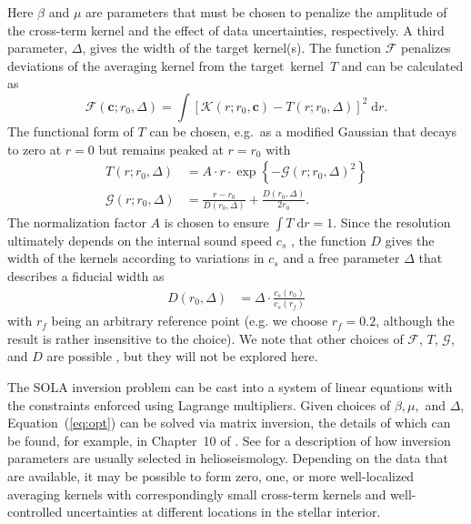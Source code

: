 \fi
Here $\beta$ and $\mu$ are parameters that must be chosen to penalize the amplitude of the cross-term kernel and the effect of data uncertainties, respectively. 
A third parameter, $\Delta$, gives the width of the target kernel(s). 
The function $\mathscr{F}$ penalizes deviations of the averaging kernel from the target~kernel~$T$ and can be calculated as
\begin{equation}
        \mathscr{F}(\mathbf c; r_0, \Delta)
        =  
        \int \left[ \mathscr{K}(r; r_0, \mathbf c) - T(r; r_0, \Delta) \right]^2 \; \text{d}r. 
\end{equation}
The functional form of $T$ can be chosen, e.g.~as a modified Gaussian that decays to zero at ${r=0}$ but remains peaked at ${r=r_0}$ \citep[e.g.][]{1999MNRAS.309...35R} with 
\begin{align}
    T(r; r_0, \Delta) &= A\cdot r\cdot \exp\left\{-\mathcal{G}(r; r_0, \Delta)^2\right\} \\
    \mathcal{G}(r; r_0, \Delta) &= \frac{r-r_0}{D(r_0, \Delta)} + \frac{D(r_0, \Delta)}{2 r_0}.
\end{align}
The normalization factor $A$ is chosen to ensure ${\int T \; \text{d}r = 1}$. 
Since the resolution ultimately depends on the internal sound speed $c_s$ \citep[][]{1993ASPC...42..141T}, the function $D$ gives the width of the kernels according to variations in $c_s$ and a free parameter $\Delta$ that describes a fiducial width as 
\begin{align}
    D(r_0, \Delta) &= \Delta \cdot \frac{c_s(r_0)}{c_s(r_f)} 
\end{align}
with $r_f$ being an arbitrary reference point (e.g. we choose ${r_f=0.2}$, although the result is rather insensitive to the choice). 
We note that other choices of $\mathscr{F}$, $T$, $\mathcal{G}$, and $D$ are possible \citep[see, e.g.,][]{1985SoPh..100...65G, 1989ApJ...343..526B}, but they will not be explored here. 

The SOLA inversion problem can be cast into a system of linear equations with the constraints enforced using Lagrange multipliers. 
Given choices of $\beta, \mu,$ and $\Delta$, Equation~(\ref{eq:opt}) can be solved via matrix inversion, the details of which can be found, for example, in Chapter~10 of \citealt{basuchaplin2017}. 
See \citet{1999MNRAS.309...35R} for a description of how inversion parameters are usually selected in helioseismology. 
Depending on the data that are available, it may be possible to form zero, one, or more well-localized averaging kernels with correspondingly small cross-term kernels and well-controlled uncertainties at different locations in the stellar interior. 


